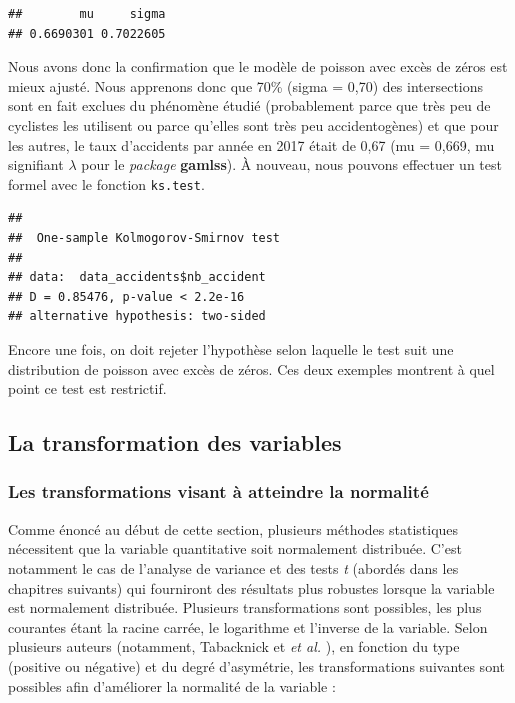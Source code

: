 \documentclass[
  11pt,
  french,
]{book}
\makeatletter
\newenvironment{Shaded}{\begin{snugshade}}{\end{snugshade}}
\newcommand{\DataTypeTok}[1]{\textcolor[rgb]{0.13,0.29,0.53}{#1}}
\newcommand{\KeywordTok}[1]{\textcolor[rgb]{0.13,0.29,0.53}{\textbf{#1}}}
\newcommand{\NormalTok}[1]{#1}
\newcommand{\OperatorTok}[1]{\textcolor[rgb]{0.81,0.36,0.00}{\textbf{#1}}}
\newcommand{\StringTok}[1]{\textcolor[rgb]{0.31,0.60,0.02}{#1}}
\newenvironment{kframe}{%
\medskip{}
\setlength{\fboxsep}{.8em}
 \def\at@end@of@kframe{}%
 \ifinner\ifhmode%
  \def\at@end@of@kframe{\end{minipage}}%
  \begin{minipage}{\columnwidth}%
 \fi\fi%
 \def\FrameCommand##1{\hskip\@totalleftmargin \hskip-\fboxsep
 \colorbox{shadecolor}{##1}\hskip-\fboxsep
     \hskip-\linewidth \hskip-\@totalleftmargin \hskip\columnwidth}%
 \MakeFramed {\advance\hsize-\width
   \@totalleftmargin\z@ \linewidth\hsize
   \@setminipage}}%
 {\par\unskip\endMakeFramed%
 \at@end@of@kframe}
\renewenvironment{Shaded}{\begin{kframe}}{\end{kframe}}
\makeatother
\begin{document}
\begin{verbatim}
##        mu     sigma 
## 0.6690301 0.7022605
\end{verbatim}

Nous avons donc la confirmation que le modèle de poisson avec excès de zéros est mieux ajusté. Nous apprenons donc que 70\% (sigma = 0,70) des intersections sont en fait exclues du phénomène étudié (probablement parce que très peu de cyclistes les utilisent ou parce qu'elles sont très peu accidentogènes) et que pour les autres, le taux d'accidents par année en 2017 était de 0,67 (mu = 0,669, mu signifiant \(\lambda\) pour le \emph{package} \textbf{gamlss}). À nouveau, nous pouvons effectuer un test formel avec le fonction \texttt{ks.test}.

\begin{Shaded}
\end{Shaded}

\begin{verbatim}
## 
##  One-sample Kolmogorov-Smirnov test
## 
## data:  data_accidents$nb_accident
## D = 0.85476, p-value < 2.2e-16
## alternative hypothesis: two-sided
\end{verbatim}

Encore une fois, on doit rejeter l'hypothèse selon laquelle le test suit une distribution de poisson avec excès de zéros. Ces deux exemples montrent à quel point ce test est restrictif.

\hypertarget{sect0255}{%
\subsection{La transformation des variables}\label{sect0255}}

\hypertarget{sect02551}{%
\subsubsection{Les transformations visant à atteindre la normalité}\label{sect02551}}

Comme énoncé au début de cette section, plusieurs méthodes statistiques nécessitent que la variable quantitative soit normalement distribuée. C'est notamment le cas de l'analyse de variance et des tests \emph{t} (abordés dans les chapitres suivants) qui fourniront des résultats plus robustes lorsque la variable est normalement distribuée. Plusieurs transformations sont possibles, les plus courantes étant la racine carrée, le logarithme et l'inverse de la variable. Selon plusieurs auteurs (notamment, Tabacknick et \emph{et al.} \citeyearpar[p.~89]{tabachnick2007}), en fonction du type (positive ou négative) et du degré d'asymétrie, les transformations suivantes sont possibles afin d'améliorer la normalité de la variable :
\end{document}

